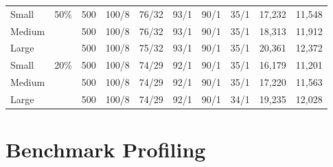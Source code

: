 \documentclass[sigconf,edbt]{acmart-edbt2024}
\begin{document}
\begin{table*}[htb]
{\begin{tabular}{@{}l|c|c|ccccc|cc@{}}
Small                                                          & \multirow{3}{*}{50\%} & 500         & 100/8            & 76/32                 & 93/1            & 90/1                    & 35/1            & 17,232                                  & 11,548                                  \\
Medium                                                         &                       & 500         & 100/8            & 76/32                 & 93/1            & 90/1                    & 35/1            & 18,313                                  & 11,912                                  \\
Large                                                          &                       & 500         & 100/8            & 75/32                 & 93/1            & 90/1                    & 35/1            & 20,361                                  & 12,372                                  \\ \midrule
Small                                                          & \multirow{3}{*}{20\%} & 500         & 100/8            & 74/29                 & 92/1            & 90/1                    & 35/1            & 16,179                                  & 11,201                                  \\
Medium                                                         &                       & 500         & 100/8            & 74/29                 & 92/1            & 90/1                    & 35/1            & 17,220                                  & 11,563                                  \\
Large                                                          &                       & 500         & 100/8            & 74/29                 & 92/1            & 90/1                    & 34/1            & 19,235                                  & 12,028                                  \\ \bottomrule
\end{tabular}}
\end{table*}  \section{Benchmark Profiling}
\label{sec:profiling}
\end{document}
